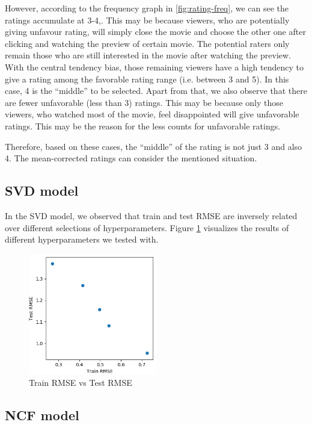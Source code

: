 \documentclass[final]{cvpr}
\begin{document}
However, according to the frequency graph in \ref{fig:rating-freq}, we can see the ratings accumulate at 3-4,.
This may be because viewers, who are potentially giving unfavour rating,
will simply close the movie and choose the other one after clicking and watching the preview of certain movie.
The potential raters only remain those who are still interested in the movie after watching the preview.
With the central tendency bias, those remaining viewers have a high tendency to give a rating among the favorable rating range (i.e. between 3 and 5).
In this case, 4 is the “middle” to be selected.
Apart from that, we also observe that there are fewer unfavorable (less than 3) ratings.
This may be because only those viewers, who watched most of the movie, feel disappointed will give unfavorable ratings.
This may be the reason for the less counts for unfavorable ratings.

Therefore, based on these cases, the “middle” of the rating is not just 3 and also 4.
The mean-corrected ratings can consider the mentioned situation.

\subsection{\ac{SVD} model}
In the SVD model, we observed that train and test RMSE are inversely related
over different selections of hyperparameters.
Figure \ref{fig:svd-rmse-scatter} visualizes the results of different hyperparameters we tested with.

\begin{figure}
	\includegraphics[width=0.5\textwidth]{screenshot20210422225123.png}
	\caption{Train RMSE vs Test RMSE}
	\label{fig:svd-rmse-scatter}
\end{figure}

\subsection{\ac{NCF} model}

{\small
	
	
}
\end{document}
